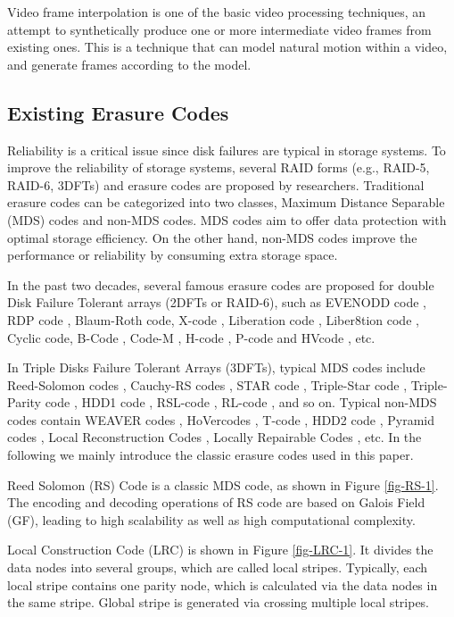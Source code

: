 \documentclass[sigconf]{acmart}
\begin{document}
Video frame interpolation is one of the basic video processing techniques, an attempt to synthetically produce one or more intermediate video frames from existing ones. This is a technique that can model natural motion within a video, and generate frames according to the model.

\subsection{Existing Erasure Codes}\label{existEC}

Reliability is a critical issue since disk failures are typical in storage systems. To improve the reliability of storage systems, several RAID forms (e.g., RAID-5, RAID-6, 3DFTs) and erasure codes are proposed by researchers.  Traditional erasure codes can be categorized into two classes, Maximum Distance Separable (MDS) codes and non-MDS codes. MDS codes aim to offer data protection with optimal storage efficiency. On the other hand, non-MDS codes improve the performance or reliability by consuming extra storage space.

In the past two decades, several famous erasure codes are proposed for double Disk Failure Tolerant arrays (2DFTs or RAID-6), such as EVENODD code \cite{EVENODD}, RDP code \cite{RDP}, Blaum-Roth code\cite{BlaumRoth}, X-code \cite{XCode}, Liberation code \cite{Liberation}, Liber8tion code \cite{Liber8tion}, Cyclic \cite {Cyclic} code, B-Code \cite{BCode}, Code-M \cite{Code-M}, H-code \cite{hcode}, P-code \cite{PCode} and HVcode \cite{HVCode}, etc.

In Triple Disks Failure Tolerant Arrays (3DFTs), typical MDS codes include Reed-Solomon codes \cite{RS}, Cauchy-RS codes \cite{CRS}, STAR code \cite{STAR}, Triple-Star code \cite{TripleStar}, Triple-Parity code \cite{TPtech}, HDD1 code \cite{HDD}, RSL-code \cite{RSL}, RL-code \cite{RL}, and so on. Typical non-MDS codes contain WEAVER codes \cite{WEAVER}, HoVercodes \cite{HoVer}, T-code \cite{TCode}, HDD2 code \cite{HDD}, Pyramid codes \cite{Pyramid}, Local Reconstruction Codes \cite{LRC}, Locally Repairable Codes \cite{XORing}, etc.
In the following we mainly introduce the classic erasure codes used in this paper.

Reed Solomon (RS) Code \cite{RS} is a classic MDS code, as shown in Figure \ref{fig-RS-1}. The encoding and decoding operations of RS code are based on Galois Field (GF), leading to high scalability as well as high computational complexity.

Local Construction Code (LRC) \cite{LRC} 
is shown in Figure \ref{fig-LRC-1}. It divides the data nodes into several groups, which are called local stripes. Typically, each local stripe contains one parity node, which is calculated via the data nodes in the same stripe. Global stripe is generated via crossing multiple local stripes.
\end{document}
